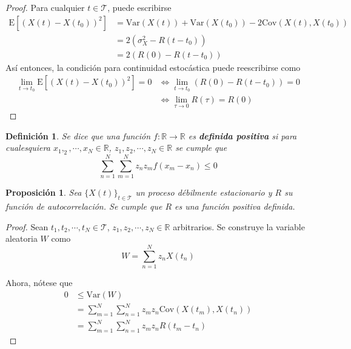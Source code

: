 \documentclass[12pt,letterpaper]{book}
\newtheorem{definicion}{Definición}[chapter]
\newtheorem{proposicion}[teorema]{Proposición}
\newcommand{\R}{\mathbb{R}}
\newcommand{\E}[1]{\mathrm{E}\left[ #1 \right]}
\newcommand{\Var}[1]{\mathrm{Var}\left( #1 \right)}
\newcommand{\Cov}[1]{\mathrm{Cov}\left( #1 \right)}
\newcommand{\xt}{$\{X(t)\}_{t\in \mathcal{T}}$ }
\begin{document}
\begin{proof}
Para cualquier $t\in \mathcal{T}$, puede escribirse
\begin{align*}
\E{\left( X(t) - X(t_0) \right)^{2}} &= \Var{X(t)} + \Var{X(t_0)} - 2 \Cov{X(t),X(t_0)} \\
&= 2 \left( \sigma_X^{2} - R(t-t_0) \right) \\
&= 2 \left( R(0) - R(t-t_0) \right)
\end{align*}
Así entonces, la condición para continuidad estocástica puede reescribirse como
\begin{align*}
\lim_{t \rightarrow t_0} \E{\left( X(t) - X(t_0) \right)^{2}} = 0 
&\Leftrightarrow
\lim_{t \rightarrow t_0} \left( R(0) - R(t-t_0) \right) = 0 \\
&\Leftrightarrow
\lim_{\tau \rightarrow 0} R(\tau) = R(0)
\end{align*}
\end{proof}

\begin{definicion}
Se dice que una función $f: \R\rightarrow \R$ es \textbf{definida positiva} si para cualesquiera $x_1, _2, \cdots, x_N \in \R$, $z_1, z_2, \cdots, z_N \in \R$ se cumple que 
\begin{equation}
\sum_{n=1}^{N} \sum_{m=1}^{N} z_n z_m f(x_m-x_n) \leq 0
\end{equation}
\end{definicion}

\begin{proposicion}
Sea \xt un proceso débilmente estacionario y $R$ su función de autocorrelación. Se cumple que $R$ es una función positiva definida.
\label{lazy:meh}
\end{proposicion}

\begin{proof}
Sean $t_1, t_2, \cdots, t_N \in \mathcal{T}$, $z_1, z_2, \cdots, z_N \in \R$ arbitrarios. Se construye la variable aleatoria $W$ como
\begin{equation}
W = \sum_{n=1}^{N} z_n X(t_n)
\end{equation}

Ahora, nótese que
\begin{align*}
0 &\leq \Var{W} \\
&= \sum_{m=1}^{N} \sum_{n=1}^{N} z_m z_n \Cov{X(t_m),X(t_n)} \\
&= \sum_{m=1}^{N} \sum_{n=1}^{N} z_m z_n R(t_m-t_n)
\end{align*}
\end{proof}
\end{document}
